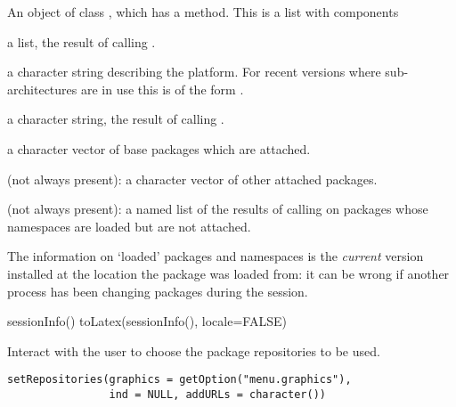 \begin{Value}
An object of class , which has a 
method. This is a list with components
\begin{ldescription}
\item[\code{R.version}] a list, the result of calling .
\item[\code{platform}] a character string describing the platform.  For recent
versions where sub-architectures are in use this is of the form
.
\item[\code{locale}] a character string, the result of calling
.
\item[\code{basePkgs}] a character vector of base packages which are attached.
\item[\code{otherPkgs}] (not always present): a character vector of other
attached packages.
\item[\code{loadedOnly}] (not always present): a named list of the results of
calling  on packages whose
namespaces are loaded but are not attached.
\end{ldescription}
\end{Value}
%
\begin{Note}\relax
The information on `loaded' packages and namespaces is the
\emph{current} version installed at the location the package was
loaded from: it can be wrong if another process has been changing
packages during the session.
\end{Note}
%
\begin{SeeAlso}\relax
{}
\end{SeeAlso}
%
\begin{Examples}
\begin{ExampleCode}

sessionInfo()
toLatex(sessionInfo(), locale=FALSE)
\end{ExampleCode}
\end{Examples}
%
\begin{Description}\relax
Interact with the user to choose the package repositories to be used.
\end{Description}
%
\begin{Usage}
\begin{verbatim}
setRepositories(graphics = getOption("menu.graphics"),
                ind = NULL, addURLs = character())
\end{verbatim}
\end{Usage}
